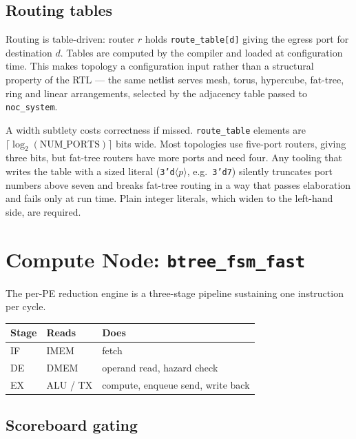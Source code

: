 \documentclass[journal,10pt]{IEEEtran}
\newcommand{\sv}[1]{\texttt{#1}}
\begin{document}
\subsection{Routing tables}

Routing is table-driven: router $r$ holds \sv{route\_table[d]} giving the
egress port for destination $d$. Tables are computed by the compiler and
loaded at configuration time. This makes topology a configuration input
rather than a structural property of the RTL --- the same netlist serves
mesh, torus, hypercube, fat-tree, ring and linear arrangements, selected by
the adjacency table passed to \sv{noc\_system}.

A width subtlety costs correctness if missed. \sv{route\_table} elements are
$\lceil\log_2(\text{NUM\_PORTS})\rceil$ bits wide. Most topologies use
five-port routers, giving three bits, but fat-tree routers have more ports
and need four. Any tooling that writes the table with a sized literal
(\sv{3'd}$\langle p\rangle$, e.g.\ \sv{3'd7}) silently truncates port numbers above seven and breaks fat-tree
routing in a way that passes elaboration and fails only at run time. Plain
integer literals, which widen to the left-hand side, are required.

\section{Compute Node: \texttt{btree\_fsm\_fast}}

The per-PE reduction engine is a three-stage pipeline sustaining one
instruction per cycle.

\begin{center}
\begin{tabular}{@{}lll@{}}
\toprule
Stage & Reads & Does \\
\midrule
IF & IMEM        & fetch \\
DE & DMEM        & operand read, hazard check \\
EX & ALU / TX    & compute, enqueue send, write back \\
\bottomrule
\end{tabular}
\end{center}

\subsection{Scoreboard gating}
\end{document}
